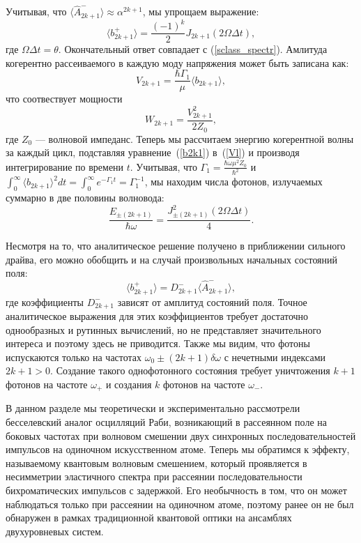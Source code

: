 Учитывая, что $\langle \hat{A}^-_{2k+1} \rangle \approx \alpha^{2k+1}$, мы упрощаем выражение:
\begin{equation}
	\langle b^+_{2k+1}\rangle = \frac{(-1)^k}{2} J_{2k+1}(2\Omega \Delta t),  
	\label{b2k1}
\end{equation}
где $\Omega \Delta t = \theta$. Окончательный ответ совпадает с  (\ref{sclass_spectr}).
Амлитуда когерентно рассеиваемого в каждую моду напряжения может быть записана как:  
\begin{equation}
	V_{2k+1} = \frac{\hbar \Gamma_1}{\mu}\langle b_{2k+1} \rangle, 
\end{equation}
что соотвествует мощности 
\begin{equation}
	W_{2k+1} = \frac{V^2_{2k+1}}{2Z_0} , 
\end{equation}
где $Z_0$ --- волновой импеданс. Теперь мы рассчитаем энергию когерентной волны за каждый цикл, подставляя уравнение~(\ref{b2k1}) в~(\ref{Vl}) и производя интегрирование по времени $t$. Учитывая, что $\Gamma_1 = \frac{\hbar\omega \mu^2 Z_0}{\hbar^2}$ и $\int_0^\infty \langle b_{2k+1} \rangle^2 dt = \int_0^\infty e^{-\Gamma_1t} = \Gamma_1^{-1}$, мы находим числа фотонов, излучаемых суммарно в две половины волновода:
\begin{equation}
	\label{Bessel_power}
	\frac{E_{\pm(2k+1)}}{\hbar\omega} = \frac{J^2_{\pm(2k+1)}(2\Omega \Delta t)}{4}.
\end{equation} 

Несмотря на то, что аналитическое решение получено в приближении сильного драйва, его можно обобщить и на случай произвольных начальных состояний поля:
\begin{equation}
	\langle b^+_{2k+1}\rangle = D^-_{2k+1}\langle\hat{A}_{2k+1}^{-}\rangle,
	\label{bg}
\end{equation}
где коэффициенты $D^-_{2k+1}$ зависят от амплитуд состояний поля. Точное аналитическое выражения для этих коэффициентов требует достаточно однообразных и рутинных вычислений, но не представляет значительного интереса и поэтому здесь не приводится. Также мы видим, что фотоны испускаются только на частотах $\omega_0 \pm (2k+1)\delta\omega$ с нечетными индексами $2k+1 > 0$. Создание такого однофотонного состояния требует уничтожения $k+1$ фотонов на частоте $\omega_+$ и создания $k$ фотонов на частоте $\omega_-$. 

В данном разделе мы теоретически и экспериментально рассмотрели бесселевский аналог осцилляций Раби, возникающий в рассеянном поле на боковых частотах при волновом смешении двух синхронных последовательностей импульсов на одиночном искусственном атоме. Теперь мы обратимся к эффекту, называемому квантовым волновым смешением, который проявляется в несимметрии эластичного спектра при рассеянии последовательности бихроматических импульсов с задержкой. Его необычность в том, что он может наблюдаться только при рассеянии на одиночном атоме, поэтому ранее он не был обнаружен в рамках традиционной квантовой оптики на ансамблях двухуровневых систем. 
